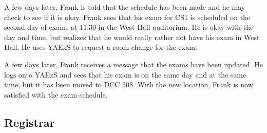 \documentclass[11pt]{article}
\begin{document}
\begin{description}
A few days later, Frank is told that the schedule has been made and he may check to see if it is okay. Frank sees that his exam for CS1 is scheduled on the second day of exams at 11:30 in the West Hall auditorium. He is okay with the day and time, but realizes that he would really rather not have his exam in West Hall. He uses YAExS to request a room change for the exam.

A few days later, Frank receives a message that the exams have been updated. He logs onto YAExS and sees that his exam is on the same day and at the same time, but it has been moved to DCC 308. With the new location, Frank is now satisfied with the exam schedule.

\end{description}


\subsection{Registrar}  %
\end{document}
